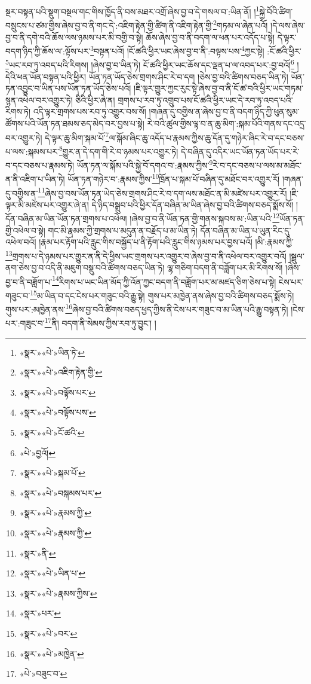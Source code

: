 སྔར་བསྟན་པའི་སྡུག་བསྔལ་གང་གིས་ཁྱོད་ནི་བས་མཐར་འགྲོ་ཞེས་བྱ་བ་དེ་གསལ་བ་:ཡིན་ནོ། །\footnote{«སྣར་»«པེ་»ཡིན་ཏེ་}སྐྱེ་བོའི་ཚིག་བསྲུངས་པ་ཙམ་གྱིས་ཞེས་བྱ་བ་ནི་གང་དེ་:འཇིག་རྟེན་གྱི་ཚིག་ནི་འཇིག་རྟེན་གྱི་\footnote{«སྣར་»«པེ་»འཇིག་རྟེན་གྱི་}གཏམ་ལ་ཞེན་པའོ། །དེ་ལས་ཞེས་བྱ་བ་ནི་དགེ་བའི་ཆོས་ལས་ཉམས་པར་མི་བགྱི་བ་སྟེ། ཆོས་ཞེས་བྱ་བ་ནི་བདག་ལ་ཕན་པར་འདོད་པ་སྟེ། དེ་ལྟར་བདག་ཉིད་ཀྱི་ཆོས་ལ་:ལྟོས་པར་\footnote{«སྣར་»«པེ་»བལྟོས་པར་}བསྟན་པའོ། །ངོ་ཚའི་ཕྱིར་ཡང་ཞེས་བྱ་བ་ནི་:བལྟས་པས་\footnote{«སྣར་»«པེ་»བལྟོས་པས་}ཀྱང་སྟེ། :ངོ་ཚའི་ཕྱིར་\footnote{«སྣར་»«པེ་»ངོ་ཚའི་}ཡང་རབ་ཏུ་འབད་པའི་རིགས། །ཞེས་བྱ་བ་ཡིན་ཏེ། ངོ་ཚའི་ཕྱིར་ཡང་ཆོས་དང་ལྡན་པ་ལ་འབད་པར་:བྱ་བའོ།\footnote{«པེ་»བྱའོ།} །དེའི་ཕན་ཡོན་བསྟན་པའི་ཕྱིར། ཡོན་ཏན་ཡོད་ཅེས་གྲགས་ཤིང་རེ་བ་དག །ཅེས་བྱ་བའི་ཚིགས་བཅད་ཡིན་ཏེ། ཡོན་ཏན་འབྱུང་བ་ཡིན་པས་ཡོན་ཏན་ཡོད་ཅེས་པའོ། །ཇི་ལྟར་གྱུར་ཀྱང་རུང་སྟེ་ཞེས་བྱ་བ་ནི་ངོ་ཚ་བའི་ཕྱིར་ཡང་གཏམ་སྙན་འཕེལ་བར་འགྱུར་ཏེ། ཅིའི་ཕྱིར་ཞེ་ན། གྲགས་པ་རབ་ཏུ་འགྲུབ་པས་ངོ་ཚའི་ཕྱིར་ཡང་དེ་རབ་ཏུ་འབད་པའི་རིགས་ཏེ། འདི་ལྟར་གྲགས་པས་རབ་ཏུ་འགྱུར་བས་སོ། །གཞན་དུ་བགྱིས་ན་ཞེས་བྱ་བ་ནི་བདག་ཉིད་ཀྱི་ཕུན་སུམ་ཚོགས་པའི་ཡོན་ཏན་ཐམས་ཅད་མེད་བར་བྱས་པ་སྟེ། རེ་བའི་ཚུལ་གྱིས་ལྟ་བ་ན་ཆུ་མིག་:སྐམ་པོའི་གནས་དང་འདྲ་བར་འགྱུར་ཏེ། དེ་ལྟར་ཆུ་མིག་སྐམ་པོ་\footnote{«སྣར་»«པེ་»སྐམ་པོ་}ལ་སྐོམ་ཞིང་ཆུ་འདོད་པ་རྣམས་ཀྱིས་ཆུ་དོན་དུ་གཉེར་ཞིང་རེ་བ་དང་བཅས་པ་ལས་:སྐམས་པར་\footnote{«སྣར་»«པེ་»བསྐམས་པར་}གྱུར་ན་དེ་དག་གི་རེ་བ་ཉམས་པར་འགྱུར་ཏེ། དེ་བཞིན་དུ་འདིར་ཡང་ཡོན་ཏན་ཡོད་པར་རེ་བ་དང་བཅས་པ་རྣམས་ཏེ། ཡོན་ཏན་ལ་སྐོམ་པའི་སྐྱེ་བོ་དགའ་བ་:རྣམས་ཀྱིས་\footnote{«སྣར་»«པེ་»རྣམས་ཀྱི་}རེ་བ་དང་བཅས་པ་ལས་མ་མཐོང་ན་ནི་འཇིག་པ་ཡིན་ཏེ། ཡོན་ཏན་གཉེར་བ་:རྣམས་ཀྱིས་\footnote{«སྣར་»«པེ་»རྣམས་ཀྱི་}ཁྲོན་པ་སྐམ་པོ་བཞིན་དུ་མཐོང་བར་འགྱུར་རོ། །གཞན་དུ་བགྱིས་ན་\footnote{«སྣར་»ནི་}ཞེས་བྱ་བས་ཡོན་ཏན་ཡེད་ཅེས་གྲགས་ཤིང་རེ་བ་དག་ལས་མཐོང་ན་མི་མཛེས་པར་འགྱུར་རོ། །ཇི་ལྟར་མི་མཛེས་པར་འགྱུར་ཞེ་ན། དེ་ཉིད་བསྒྲུབ་པའི་ཕྱིར་དོན་བཞིན་མ་ཡིན་ཞེས་བྱ་བའི་ཚིགས་བཅད་སྨོས་སོ། །དོན་བཞིན་མ་ཡིན་ཡོན་ཏན་གྲགས་པ་འཕེལ། །ཞེས་བྱ་བ་ནི་ཡོན་ཏན་གྱི་གནས་སྐབས་མ་:ཡིན་པའི་\footnote{«སྣར་»«པེ་»ཡིན་པ་}ཡོན་ཏན་གྱི་འཕེལ་བ་སྟེ། གང་མི་རྣམས་ཀྱི་གྲགས་པ་མདུན་ན་བརྗོད་པ་མ་ཡིན་ཏེ། དོན་བཞིན་མ་ཡིན་པ་ཡུན་རིང་དུ་འཕེལ་བའོ། །རྣམ་པར་རྟོག་པའི་རླུང་གིས་བསྐྱོད་པ་ནི་རྟོག་པའི་རླུང་གིས་ཉམས་པར་བྱས་པའོ། །མི་:རྣམས་ཀྱི་\footnote{«སྣར་»«པེ་»རྣམས་ཀྱིས་}གྲགས་པ་དེ་ཉམས་པར་གྱུར་ན་ནི་དེ་ཕྱིས་ཡང་གྲགས་པར་འགྱུར་བ་ཞེས་བྱ་བ་ནི་འཕེལ་བར་འགྱུར་བའོ། །སྦྲུལ་ནག་ཅེས་བྱ་བ་འདི་ནི་མཇུག་བསྡུ་བའི་ཚིགས་བཅད་ཡིན་ཏེ། ལྷ་གཅིག་བདག་ནི་བཟློག་པར་མི་རིགས་སོ། །ཞེས་བྱ་བ་ནི་བཟློག་པ་\footnote{«སྣར་»པར་}རིགས་པ་ཡང་ཡིན་མོད་ཀྱི་འོན་ཀྱང་བདག་ནི་བཟློག་པར་མ་མཛད་ཅིག་ཅེས་པ་སྟེ། ངེས་པར་གཟུང་བ་\footnote{«སྣར་»«པེ་»བར་}མ་ཡིན་བ་དང་ངེས་པར་གཟུང་བའི་རྒྱུ་སྟེ། གུས་པར་མཁྱེན་ནས་ཞེས་བྱ་བའི་ཚིགས་བཅད་སྨོས་ཏེ། གུས་པར་:མཁྱེན་ནས་\footnote{«སྣར་»«པེ་»མཁྱེན་}ཞེས་བྱ་བའི་ཚིགས་བཅད་ཕྱད་ཀྱིས་ནི་ངེས་པར་གཟུང་བ་མ་ཡིན་པའི་རྒྱུ་བསྟན་ཏེ། །ངེས་པར་:གཟུང་བ་\footnote{«པེ་»བཟུང་བ་}ནི། བདག་ནི་སེམས་ཀྱིས་རབ་ཏུ་བྱུང་། །
